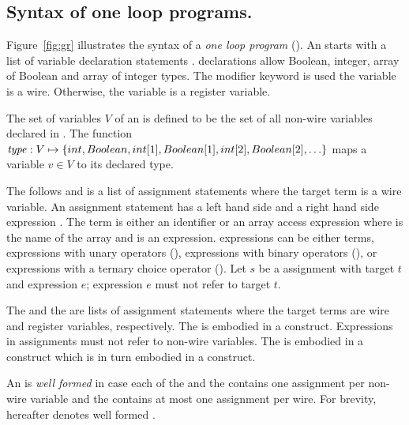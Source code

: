 \subsection{Syntax of one loop programs.}
%

Figure~\ref{fig:gr} illustrates the syntax of a 
{\em one loop program} (\caig).
An \caig starts with 
a list of variable declaration statements . 
\caig declarations allow Boolean, integer, array of Boolean 
and array of integer types.
The  modifier keyword is used
the variable is a wire. 
Otherwise, the variable is a register variable. 



\begin{definition}
The set of \caig variables $V$ of an \caig is defined to be 
the set 
of all non-wire variables declared in .
The function $\mathit{type}: V \mapsto \{ int, Boolean, int[1], Boolean[1], int[2], Boolean[2], \ldots \}$ maps a variable
$v \in V$ to its declared type. 
\end{definition}



The  follows  and is a list 
of assignment statements where the target term is a wire 
variable. 
An assignment statement has a left hand side  and 
a right hand side expression . 
The term is either an identifier  or an array 
access expression  where  is the name
of the array and  is an expression. 
\caig expressions can be either terms, expressions with unary
operators (\cci{-,!}), expressions with binary operators (\cci{+,-,*,/,<,>,<=,>=,==,\&\&,||}), 
or expressions with a ternary choice operator 
(). 
Let $s$ be a  assignment with target $t$ and 
expression $e$; expression $e$ must not refer to target $t$. 



The  and the  are lists 
of assignment statements where the target terms are wire and
register variables, respectively. 
The  is embodied in a  
construct. 
Expressions in  assignments 
must not refer to non-wire
variables. 
The  is embodied in a  construct
which is in turn embodied in a  construct. 



\begin{definition}
An \caig is {\em well formed} in case each of 
the  and the 
contains one assignment per non-wire variable and
the  contains at most 
one assignment per wire. 
For brevity, \caig hereafter denotes well 
formed \caig. 
\end{definition}



